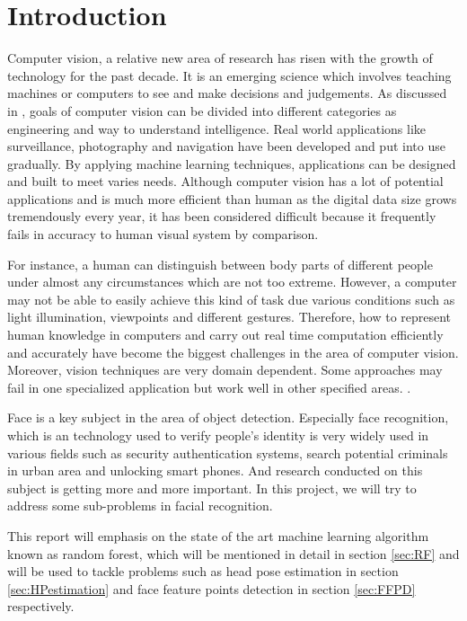 \chapter{Introduction}
\label {sec:introduction}
Computer vision, a relative new area of research has risen with the growth of technology for the past decade. It is an emerging science which involves teaching machines or computers to see and make decisions and judgements. As discussed in \cite{EGL}, goals of computer vision can be divided into different categories as engineering and way to understand intelligence. Real world applications like surveillance, photography and navigation have been developed and put into use gradually. By applying machine learning techniques, applications can be designed and built to meet varies needs. Although computer vision has a lot of potential applications and is much more efficient than human as the digital data size grows tremendously every year, it has been considered difficult because it frequently fails in accuracy to human visual system by comparison. 

For instance, a human can distinguish between body parts of different people under almost any circumstances which are not too extreme. However, a computer may not be able to easily achieve this kind of task due various conditions such as light illumination, viewpoints and different gestures. Therefore, how to represent human knowledge in computers and carry out real time computation efficiently and accurately have become the biggest challenges in the area of computer vision. Moreover, vision techniques are very domain dependent. Some approaches may fail in one specialized application but work well in other specified areas. \cite{EGL}. 

Face is a key subject in the area of object detection. Especially face recognition, which is an technology used to verify people's identity is very widely used in various fields such as security authentication systems, search potential criminals in urban area and unlocking smart phones. And research conducted on this subject is getting more and more important. In this project, we will try to address some sub-problems in facial recognition.

This report will emphasis on the state of the art machine learning algorithm known as random forest, which will be mentioned in detail in section \ref{sec:RF} and will be used to tackle problems such as head pose estimation in section \ref{sec:HPestimation} and face feature points detection in section \ref{sec:FFPD} respectively.